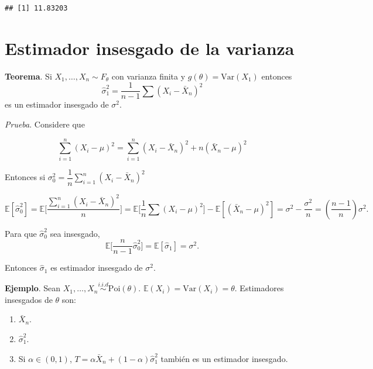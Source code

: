 \documentclass[
  12pt,
]{book}
\begin{document}
\begin{verbatim}
## [1] 11.83203
\end{verbatim}

\hypertarget{estimador-insesgado-de-la-varianza}{%
\section{Estimador insesgado de la varianza}\label{estimador-insesgado-de-la-varianza}}

\textbf{Teorema}. Si \(X_1,\dots, X_n \sim F_{\theta}\) con varianza finita y \(g(\theta) = \text{Var}(X_1)\) entonces
\[\hat\sigma_1^2 = \dfrac{1}{n-1}\sum(X_i-\bar X_n)^2\]
es un estimador insesgado de \(\sigma^2\).

\emph{Prueba}. Considere que

\begin{equation}
\sum_{i=1}^{n}\left(X_{i}-\mu\right)^{2}=\sum_{i=1}^{n}\left(X_{i}-\bar{X}_{n}\right)^{2}+n\left(\bar{X}_{n}-\mu\right)^{2}
\end{equation}

Entonces si \(\sigma_0 ^{2} = \dfrac 1n \sum_{i=1}^{n}\left(X_{i}-\bar{X}_{n}\right)^{2}\)

\[\mathbb E[\hat\sigma_0^2] = \mathbb E \bigg[ \dfrac {\sum_{i=1}^{n}\left(X_{i}-\bar{X}_{n}\right)^{2}}n \bigg] =  \mathbb E \bigg[ \dfrac 1n \sum(X_i-\mu)^2\bigg] - \mathbb E[(\bar X_n-\mu)^2] = \sigma^2-\dfrac{\sigma^2}n = \left(\dfrac{n-1}n\right)\sigma^2.\]

Para que \(\hat\sigma_0^2\) sea insesgado,
\[\mathbb E \bigg[\dfrac n{n-1}\hat\sigma_0^2\bigg] = \mathbb E[\hat\sigma_1] = \sigma^2.\]

Entonces \(\hat\sigma_1\) es estimador insesgado de \(\sigma^2\).

\textbf{Ejemplo}. Sean \(X_1,\dots,X_n \overset{i.i.d}{\sim}\text{Poi}(\theta)\).
\(\mathbb E(X_i) = \text{Var}(X_i) = \theta\). Estimadores insesgados de \(\theta\)
son:

\begin{enumerate}
\def\labelenumi{\arabic{enumi}.}
\item
  \(\bar X_n\).
\item
  \(\hat \sigma_1^2\).
\item
  Si \(\alpha \in (0,1)\), \(T = \alpha\bar X_n + (1-\alpha)\hat\sigma_1^2\)
  también es un estimador insesgado.
\end{enumerate}
\end{document}
